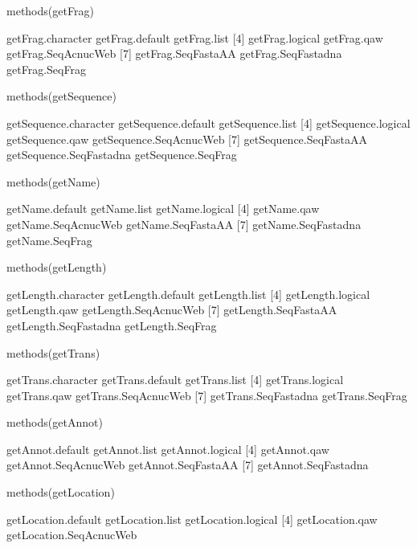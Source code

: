 \documentclass{article}
\begin{document}
\begin{Schunk}
\begin{Sinput}
 methods(getFrag)
\end{Sinput}
\begin{Soutput}
[1] getFrag.character   getFrag.default     getFrag.list       
[4] getFrag.logical     getFrag.qaw         getFrag.SeqAcnucWeb
[7] getFrag.SeqFastaAA  getFrag.SeqFastadna getFrag.SeqFrag    
\end{Soutput}
\begin{Sinput}
 methods(getSequence)
\end{Sinput}
\begin{Soutput}
[1] getSequence.character   getSequence.default     getSequence.list       
[4] getSequence.logical     getSequence.qaw         getSequence.SeqAcnucWeb
[7] getSequence.SeqFastaAA  getSequence.SeqFastadna getSequence.SeqFrag    
\end{Soutput}
\begin{Sinput}
 methods(getName)
\end{Sinput}
\begin{Soutput}
[1] getName.default     getName.list        getName.logical    
[4] getName.qaw         getName.SeqAcnucWeb getName.SeqFastaAA 
[7] getName.SeqFastadna getName.SeqFrag    
\end{Soutput}
\begin{Sinput}
 methods(getLength)
\end{Sinput}
\begin{Soutput}
[1] getLength.character   getLength.default     getLength.list       
[4] getLength.logical     getLength.qaw         getLength.SeqAcnucWeb
[7] getLength.SeqFastaAA  getLength.SeqFastadna getLength.SeqFrag    
\end{Soutput}
\begin{Sinput}
 methods(getTrans)
\end{Sinput}
\begin{Soutput}
[1] getTrans.character   getTrans.default     getTrans.list       
[4] getTrans.logical     getTrans.qaw         getTrans.SeqAcnucWeb
[7] getTrans.SeqFastadna getTrans.SeqFrag    
\end{Soutput}
\begin{Sinput}
 methods(getAnnot)
\end{Sinput}
\begin{Soutput}
[1] getAnnot.default     getAnnot.list        getAnnot.logical    
[4] getAnnot.qaw         getAnnot.SeqAcnucWeb getAnnot.SeqFastaAA 
[7] getAnnot.SeqFastadna
\end{Soutput}
\begin{Sinput}
 methods(getLocation)
\end{Sinput}
\begin{Soutput}
[1] getLocation.default     getLocation.list        getLocation.logical    
[4] getLocation.qaw         getLocation.SeqAcnucWeb
\end{Soutput}
\end{Schunk}
\end{document}
